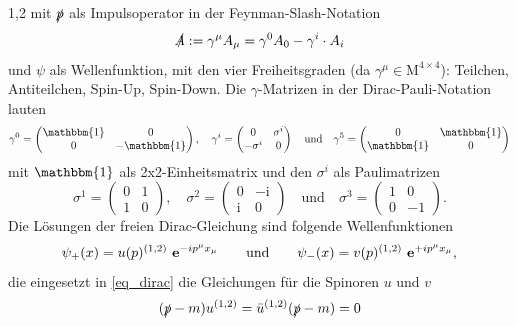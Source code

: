 \documentclass[11pt,a4paper,twoside]{report}
\begin{document}
\begin{spacing}{1,2}
mit $\slashed{p}$ als Impulsoperator in der Feynman-Slash-Notation
\begin{equation}
 \slashed{A} := \gamma^\mu A_\mu = \gamma^0 A_0 - \gamma^i\cdot A_i
\end{equation}
und $\psi$ als Wellenfunktion, mit den vier Freiheitsgraden (da $\gamma^\mu \in \text{M}^{4\times4}$): Teilchen, Antiteilchen, Spin-Up, Spin-Down.
Die $\gamma$-Matrizen in der Dirac-Pauli-Notation lauten
\begin{equation*}
  \gamma^0 = \begin{pmatrix} 
              \mathbbm{1} & 0 \\
              0 & -\mathbbm{1}
             \end{pmatrix},\quad \gamma^i = \begin{pmatrix}
					0 & \sigma^i\\
					-\sigma^i & 0
				      \end{pmatrix} \quad \text{und}\quad \gamma^5 = \begin{pmatrix}
									  0 & \mathbbm{1}\\
									  \mathbbm{1} & 0
									   \end{pmatrix}
\end{equation*}
mit $\mathbbm{1}$ als 2x2-Einheitsmatrix und den $\sigma^i$ als Paulimatrizen
\begin{equation*}
 \sigma^1 = \begin{pmatrix}
             0 & 1\\
             1 & 0
            \end{pmatrix},\quad \sigma^2 = \begin{pmatrix}
					    0 & -\text{i}\\
					    \text{i} & 0
					    \end{pmatrix}\quad \text{und} \quad\sigma^3 = \begin{pmatrix}
									    1 & 0\\
									    0 & -1
									    \end{pmatrix}.									    
\end{equation*}
Die Lösungen der freien Dirac-Gleichung sind folgende Wellenfunktionen
\begin{align}
 \psi_+(x) = u(p)^{(1,2)} \ \mathbf{e}^{-ip^\mu x_\mu}\qquad\text{und}\qquad \psi_-(x) = v(p)^{(1,2)} \ \mathbf{e}^{+ip^\mu x_\mu},
 \label{eq_diracLsg}
\end{align}
die eingesetzt in \eqref{eq_dirac} die Gleichungen für die Spinoren $u$ und $v$
\begin{align}
 (\slashed{p} - m )u^{(1,2)} &= \bar u^{(1,2)}(\slashed{p}-m) = 0 \\

\end{align}
\end{spacing}
\end{document}
